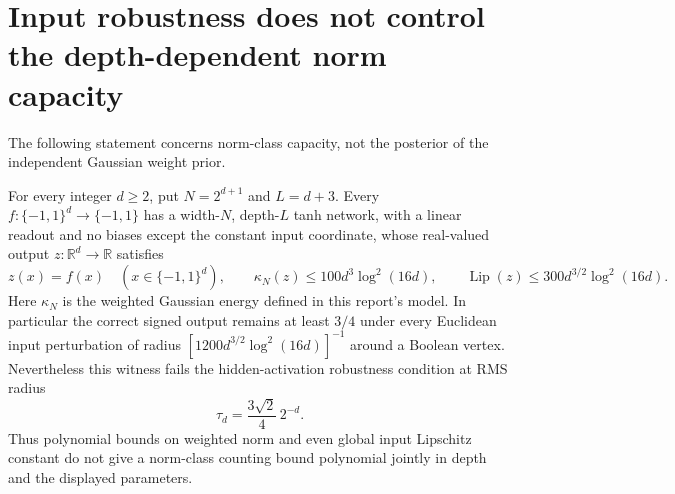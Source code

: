 \section{Input robustness does not control the depth-dependent norm capacity}
\label{sec:inputcounter}

The following statement concerns norm-class capacity, not the posterior of the
independent Gaussian weight prior.

\begin{proposition}
For every integer $d\ge2$, put $N=2^{d+1}$ and $L=d+3$.
Every $f:\{-1,1\}^d\to\{-1,1\}$ has a width-$N$, depth-$L$ tanh network,
with a linear readout and no biases except the constant input coordinate,
whose real-valued output $z:\mathbb R^d\to\mathbb R$ satisfies
\[
 z(x)=f(x)\quad(x\in\{-1,1\}^d),\qquad
 \kappa_N(z)\le100d^3\log^2(16d),\qquad
 \operatorname{Lip}(z)\le300d^{3/2}\log^2(16d).
\]
Here $\kappa_N$ is the weighted Gaussian energy defined in this report's model.
In particular the correct signed output remains at least $3/4$ under every
Euclidean input perturbation of radius
$[1200d^{3/2}\log^2(16d)]^{-1}$ around a Boolean vertex.
Nevertheless this witness fails the hidden-activation robustness condition
at RMS radius
\[
 \tau_d=\frac{3\sqrt2}{4}\,2^{-d}.
\]
Thus polynomial bounds on weighted norm and even global input Lipschitz
constant do not give a norm-class counting bound polynomial jointly in depth
and the displayed parameters.
\end{proposition}

